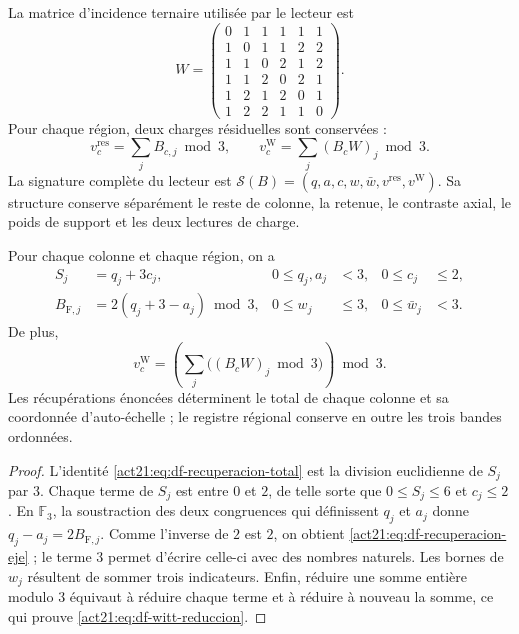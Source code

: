 La matrice d'incidence ternaire utilisée par le lecteur est
\begin{equation}
 W=\begin{pmatrix}
0&1&1&1&1&1\\
1&0&1&1&2&2\\
1&1&0&2&1&2\\
1&1&2&0&2&1\\
1&2&1&2&0&1\\
1&2&2&1&1&0
\end{pmatrix}.
\label{act21:eq:df-matriz-witt}
\end{equation}
Pour chaque région, deux charges résiduelles sont conservées :
\begin{equation}
 v_c^{\mathrm{res}}=\sum_j B_{c,j}\bmod3,
 \qquad
 v_c^{\mathrm W}=\sum_j(B_cW)_j\bmod3.
 \label{act21:eq:df-cargas-residuales}
\end{equation}
La signature complète du lecteur est
\(\mathcal S(B)=(q,a,c,w,\bar w,v^{\mathrm{res}},v^{\mathrm W})\).
Sa structure conserve séparément le reste de colonne, la retenue, le
contraste axial, le poids de support et les deux lectures de charge.

\begin{theorem}
\label{act21:thm:df-recuperacion-firma}
Pour chaque colonne et chaque région, on a
\begin{align}
 S_j&=q_j+3c_j,&0\leq q_j,a_j&<3,&0\leq c_j&\leq2,
 \label{act21:eq:df-recuperacion-total}\\
 B_{\mathrm F,j}&=2(q_j+3-a_j)\bmod3,&0\leq w_j&\leq3,
 &0\leq\bar w_j&<3.
 \label{act21:eq:df-recuperacion-eje}
\end{align}
De plus,
\begin{equation}
 v_c^{\mathrm W}
 =\left(\sum_j\bigl((B_cW)_j\bmod3\bigr)\right)\bmod3.
 \label{act21:eq:df-witt-reduccion}
\end{equation}
Les récupérations énoncées déterminent le total de chaque colonne et sa
coordonnée d'auto-échelle ; le registre régional conserve en outre
les trois bandes ordonnées.
\end{theorem}

\begin{proof}
L'identité \eqref{act21:eq:df-recuperacion-total} est la division euclidienne de
\(S_j\) par \(3\). Chaque terme de \(S_j\) est entre \(0\) et \(2\),
de telle sorte que \(0\leq S_j\leq6\) et \(c_j\leq2\). En \(\mathbb F_3\),
la soustraction des deux congruences qui définissent \(q_j\) et \(a_j\) donne
\(q_j-a_j=2B_{\mathrm F,j}\). Comme l'inverse de \(2\) est \(2\), on
obtient \eqref{act21:eq:df-recuperacion-eje} ; le terme \(3\) permet
d'écrire celle-ci avec des nombres naturels. Les bornes de \(w_j\) résultent de sommer trois
indicateurs. Enfin, réduire une somme entière modulo \(3\) équivaut
à réduire chaque terme et à réduire à nouveau la somme, ce qui prouve
\eqref{act21:eq:df-witt-reduccion}.
\end{proof}

